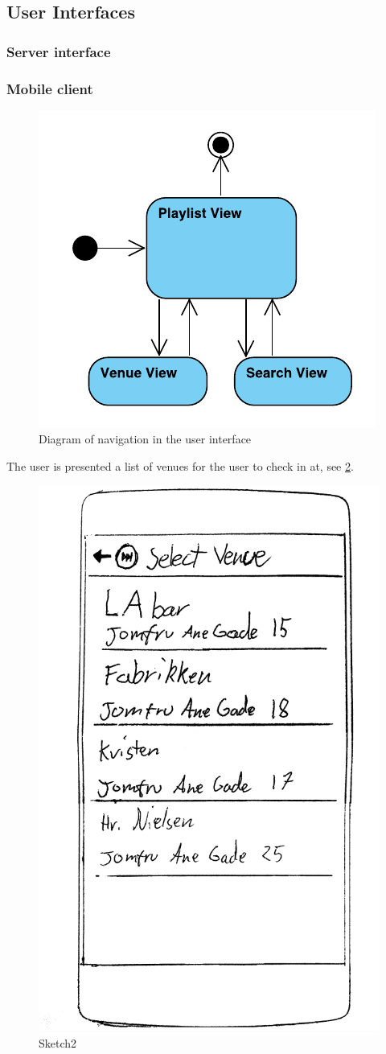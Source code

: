 \subsection{User Interfaces}

\subsubsection{Server interface}

\subsubsection{Mobile client}

\begin{figure}
  \centering
  \includegraphics[width=0.5\linewidth]{Images/UserInterface.pdf}
  \caption{Diagram of navigation in the user interface}
  \label{fig:UserInterface}
\end{figure}


The user is presented a list of venues for the user to check in at, see \cref{fig:sketch2}.

\begin{figure}
  \centering
  \includegraphics[width=0.25\linewidth]{Images/sketch2.png}
  \caption{Sketch2}
  \label{fig:sketch2}
\end{figure}

